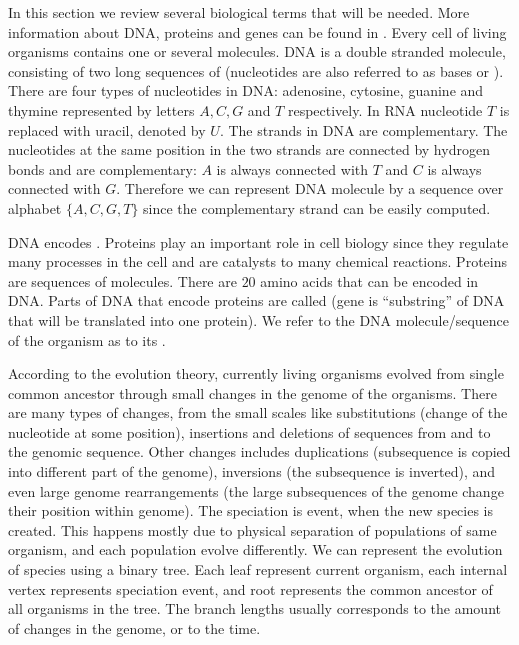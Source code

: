In this section we review several biological terms that will be needed. More
information about DNA, proteins and genes can be found in
\cite{BiologyForDummies, UnderstandingBioinformatics}.  Every cell of living
organisms contains one or several  molecules. DNA is a double
stranded molecule, consisting of two long sequences of 
(nucleotides are also referred to as bases or ). There are
four types of nucleotides in DNA: adenosine, cytosine, guanine and thymine
represented by letters $A,C,G$ and $T$ respectively. In RNA nucleotide $T$ is
replaced with uracil, denoted by $U$. The strands in DNA are complementary. The
nucleotides at the same position in the two strands are connected by hydrogen
bonds and are complementary: $A$ is always connected with $T$ and $C$ is always
connected with $G$. Therefore we can represent DNA molecule by a sequence over
alphabet $\{A,C,G,T\}$ since the complementary strand can be easily computed.

DNA encodes . Proteins play an important role in cell
biology since  they regulate many processes in the cell and are catalysts to
many chemical reactions. Proteins are sequences of 
molecules. There are $20$ amino acids that can be encoded in DNA. Parts of DNA
that encode proteins are called  (gene is ``substring'' of
DNA that will be translated into one protein). We refer to the DNA molecule/sequence of
the organism as to its .

According to the evolution theory, currently living organisms evolved from
single common ancestor through small changes in the genome of the organisms.
There are many types of changes, from the small scales like substitutions
(change of the nucleotide at some position), insertions and deletions of
sequences from and to the genomic sequence. Other changes includes duplications
(subsequence is copied into different part of the genome), inversions (the
subsequence is inverted), and even large genome rearrangements (the large
subsequences of the genome change their position within genome). The speciation
is event, when the new species is created. This happens mostly due to physical
separation of populations of same organism, and each population evolve
differently. We can represent the evolution of species using a binary tree.
Each leaf represent current organism, each internal vertex represents
speciation event, and root represents the common ancestor of all organisms in
the tree. The branch lengths usually corresponds to the amount of changes in
the genome, or to the time. 

